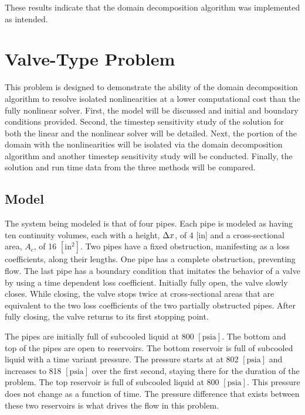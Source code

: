 These results indicate that the domain decomposition algorithm was implemented as intended.

\section{Valve-Type Problem}
\label{sect:valveProblem}

This problem is designed to demonstrate the ability of the domain decomposition algorithm to resolve isolated nonlinearities at a lower computational cost than the fully nonlinear solver. 
First, the model will be discussed and initial and boundary conditions provided.
Second, the timestep sensitivity study of the solution for both the linear and the nonlinear solver will be detailed.
Next, the portion of the domain with the nonlinearities will be isolated via the domain decomposition algorithm and another timestep sensitivity study will be conducted.
Finally, the solution and run time data from the three methods will be compared.

\subsection{Model}
\label{subsect:valveModel}

The system being modeled is that of four pipes.
Each pipe is modeled as having ten continuity volumes, each with a height, $\dx{}$, of 4 [in] and a cross-sectional area, $ A_{c} $, of 16 $[\text{in}^{2}]$.
Two pipes have a fixed obstruction, manifesting as a loss coefficients, along their lengths.
One pipe has a complete obstruction, preventing flow.
The last pipe has a boundary condition that imitates the behavior of a valve by using a time dependent loss coefficient.
Initially fully open, the valve slowly closes.
While closing, the valve stops twice at cross-sectional areas that are equivalent to the two loss coefficients of the two partially obstructed pipes.
After fully closing, the valve returns to its first stopping point.

The pipes are initially full of subcooled liquid at 800 $[ \text{psia}] $.
The bottom and top of the pipes are open to reservoirs.
The bottom reservoir is full of subcooled liquid with a time variant pressure.
The pressure starts at at 802 $[ \text{psia} ] $ and increases to 818 $[ \text{psia}]$ over the first second, staying there for the duration of the problem.
The top reservoir is full of subcooled liquid at 800 $[\text{psia} ] $.
This pressure does not change as a function of time.
The pressure difference that exists between these two reservoirs is what drives the flow in this problem.

